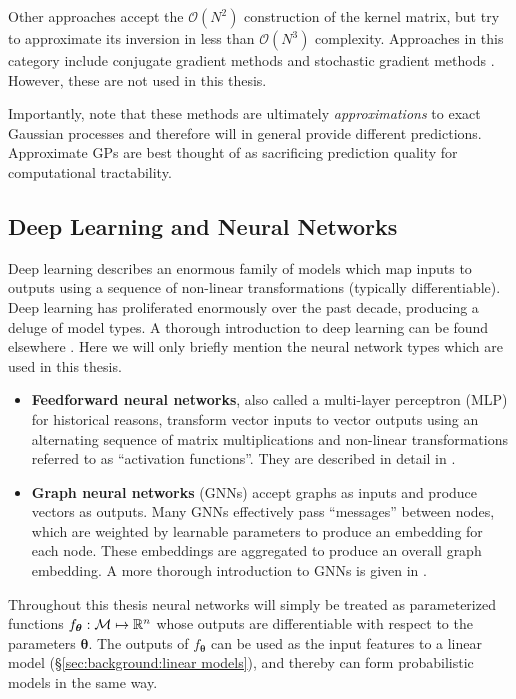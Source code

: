 Other approaches accept the $\mathcal O (N^2)$ construction of the kernel matrix,
but try to approximate its inversion in less than $\mathcal O (N^3)$ complexity.
Approaches in this category include conjugate gradient methods
\citep{gardner2018gpytorch,wang2019exact}
and stochastic gradient methods
\citep{antoran2023samplingbased,lin2023sampling-sgd,lin2024stochastic}.
However, these are not used in this thesis.

Importantly, note that these methods are ultimately \emph{approximations}
to exact Gaussian processes and therefore will in general provide different predictions.
Approximate GPs are best thought of as sacrificing prediction quality
for computational tractability.

\subsection{Deep Learning and Neural Networks}
\label{sec:background:deep learning for molecules}

Deep learning describes an enormous family of models which map inputs to outputs
using a sequence of non-linear transformations (typically differentiable).
Deep learning has proliferated enormously over the past decade,
producing a deluge of model types.
A thorough introduction to deep learning can be found elsewhere
\citep{Goodfellow-et-al-2016deep-learning,murphy2022probabilistic}.
Here we will only briefly mention the neural network types which are used in this thesis.

\begin{itemize}
    \item \textbf{Feedforward neural networks},
        also called a multi-layer perceptron (MLP) for historical reasons,
        transform vector inputs to vector outputs using an alternating sequence of matrix multiplications
        and non-linear transformations referred to as ``activation functions''.
        They are described in detail in \citet[chapter 6]{Goodfellow-et-al-2016deep-learning}.
    \item \textbf{Graph neural networks} (GNNs)
        accept graphs as inputs and produce vectors as outputs.
        Many GNNs effectively pass ``messages'' between nodes,
        which are weighted by learnable parameters to produce an embedding for each node.
        These embeddings are aggregated to produce an overall graph embedding.
        A more thorough introduction to GNNs is given in
        \citet{zhou2020graph}.
\end{itemize}

Throughout this thesis neural networks will simply be treated as parameterized
functions $f_{\bm{\theta}}:\mathcal{M} \mapsto \mathbb{R}^n$
whose outputs are differentiable with respect to the parameters $\bm{\theta}$.
The outputs of $f_{\bm{\theta}}$ can be used as the input features to a linear model
(\S\ref{sec:background:linear models}),
and thereby can form probabilistic models in the same way.

